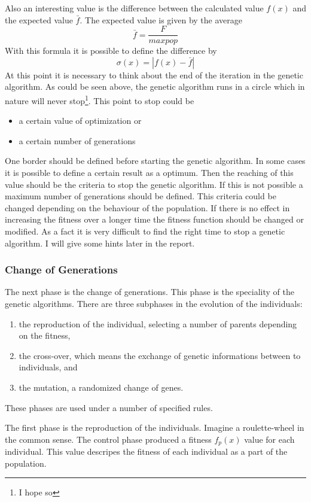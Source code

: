 Also an interesting value is the difference between the calculated value $f(x)$
and the expected value $\bar{f}$. The expected value is given by the average
$$\bar{f} = \frac{F}{maxpop}$$
With this formula it is possible to define the difference by
$$\sigma(x) = | f(x) - \bar{f} |$$
At this point it is necessary to think about the end of the iteration in the
genetic algorithm. As could be seen above, the genetic algorithm runs in a circle
which in nature will never stop\footnote{I hope so}. This point to stop could
be
\begin{itemize}
  \item a certain value of optimization or
  \item a certain number of generations
\end{itemize}
One border should be defined before starting the genetic algorithm. In some
cases it is possible to define a certain result as a optimum. Then the reaching
of this value should be the criteria to stop the genetic algorithm. If this
is not possible a maximum number of generations should be defined. This criteria
could be changed depending on the behaviour of the population. If there is no
effect in increasing the fitness over a longer time the fitness function should
be changed or modified. As a fact it is very difficult to find the right time
to stop a genetic algorithm. I will give some hints later in the report.
\subsubsection{Change of Generations}
The next phase is the change of generations. This phase is the speciality of
the genetic algorithms. There are three subphases in the evolution of the individuals:
\begin{enumerate}
  \item the reproduction of the individual, selecting a number of parents depending 
on the fitness,
  \item the cross-over, which means the exchange of genetic informations between
to individuals, and
  \item the mutation, a randomized change of genes.
\end{enumerate}
These phases are used under a number of specified rules.

The first phase is the reproduction of the individuals. Imagine a roulette-wheel
in the common sense. The control phase produced a fitness $f_p(x)$ value for each 
individual. This value descripes the fitness of each individual as a part of
the population.
 
